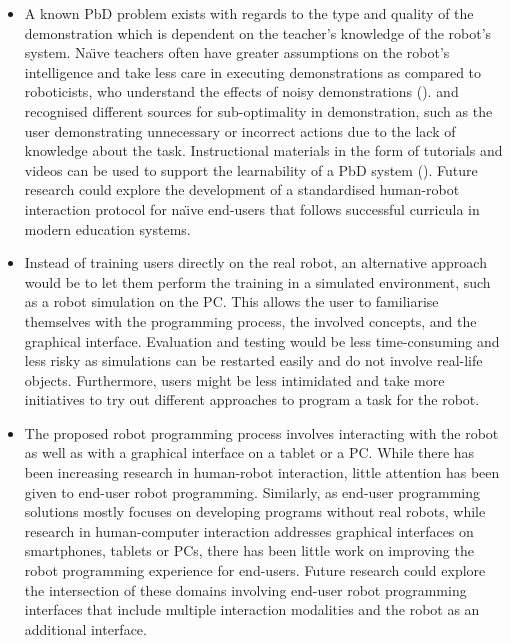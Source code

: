 \begin{itemize}
	\item {
		A known PbD problem exists with regards to the type and quality of the demonstration which is dependent on the teacher's knowledge of the robot's system.
		Na\"{\i}ve teachers often have greater assumptions on the robot's intelligence and take less care in executing demonstrations as compared to roboticists, who understand the effects of noisy demonstrations (\cite{suay2012practical}).
		\cite{chen2003programing} and \cite{kaiser1995obtaining} recognised different sources for sub-optimality in demonstration, such as the user demonstrating unnecessary or incorrect actions due to the lack of knowledge about the task.
		Instructional materials in the form of tutorials and videos can be used to support the learnability of a PbD system (\cite{cakmak2014teaching}).
		Future research could explore the development of a standardised human-robot interaction protocol for na\"{\i}ve end-users that follows successful curricula in modern education systems.
	}
	\item {
	Instead of training users directly on the real robot, an alternative approach would be to let them perform the training in a simulated environment, such as a robot simulation on the PC.
	This allows the user to familiarise themselves with the programming process, the involved concepts, and the graphical interface.
	Evaluation and testing would be less time-consuming and less risky as simulations can be restarted easily and do not involve real-life objects.
	Furthermore, users might be less intimidated and take more initiatives to try out different approaches to program a task for the robot.
	}
	\item {%
		The proposed robot programming process involves interacting with the robot as well as with a graphical interface on a tablet or a PC. 
	While there has been increasing research in human-robot interaction, little attention has been given to end-user robot programming.
	Similarly, as end-user programming solutions mostly focuses on developing programs without real robots, while research in human-computer interaction addresses graphical interfaces on smartphones, tablets or PCs,
	there has been little work on improving the robot programming experience for end-users.
	Future research could explore the intersection of these domains involving end-user robot programming interfaces that include multiple interaction modalities and the robot as an additional interface.}

\end{itemize}


